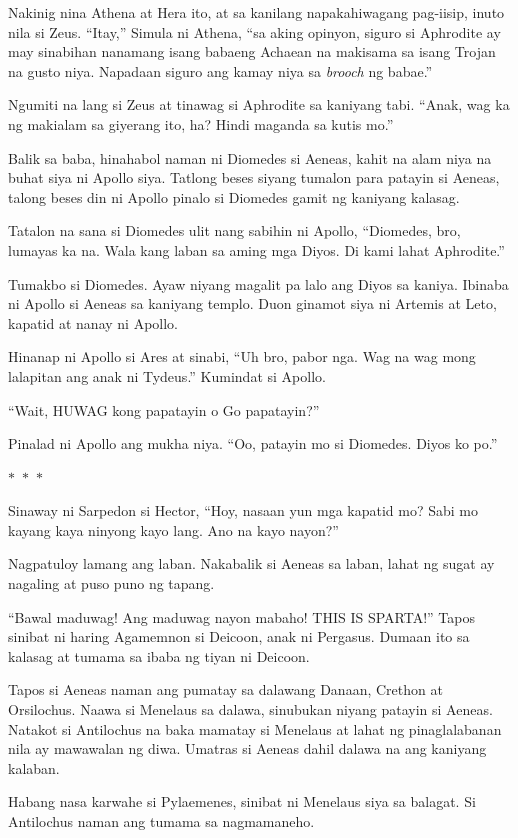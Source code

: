 \documentclass[12pt,letterpaper]{report}
\newcommand{\seperate}{\begin{center}$\ast$~$\ast$~$\ast$\end{center}}
\begin{document}
Nakinig nina Athena at Hera ito, at sa kanilang napakahiwagang pag-iisip, inuto nila si Zeus. ``Itay,'' Simula ni Athena, ``sa aking opinyon, siguro si Aphrodite ay may sinabihan nanamang isang babaeng Achaean na makisama sa isang Trojan na gusto niya. Napadaan siguro ang kamay niya sa \textit{brooch} ng babae.''

Ngumiti na lang si Zeus at tinawag si Aphrodite sa kaniyang tabi. ``Anak, wag ka ng makialam sa giyerang ito, ha? Hindi maganda sa kutis mo.''

Balik sa baba, hinahabol naman ni Diomedes si Aeneas, kahit na alam niya na buhat siya ni Apollo siya. Tatlong beses siyang tumalon para patayin si Aeneas, talong beses din ni Apollo pinalo si Diomedes gamit ng kaniyang kalasag.

Tatalon na sana si Diomedes ulit nang sabihin ni Apollo, ``Diomedes, bro, lumayas ka na. Wala kang laban sa aming mga Diyos. Di kami lahat Aphrodite.''

Tumakbo si Diomedes. Ayaw niyang magalit pa lalo ang Diyos sa kaniya. Ibinaba ni Apollo si Aeneas sa kaniyang templo. Duon ginamot siya ni Artemis at Leto, kapatid at nanay ni Apollo.

Hinanap ni Apollo si Ares at sinabi, ``Uh bro, pabor nga. Wag na wag mong lalapitan ang anak ni Tydeus.'' Kumindat si Apollo.

``Wait, HUWAG kong papatayin o Go papatayin?''

Pinalad ni Apollo ang mukha niya. ``Oo, patayin mo si Diomedes. Diyos ko po.''

\seperate

Sinaway ni Sarpedon si Hector, ``Hoy, nasaan yun mga kapatid mo? Sabi mo kayang kaya ninyong kayo lang. Ano na kayo nayon?''

Nagpatuloy lamang ang laban. Nakabalik si Aeneas sa laban, lahat ng sugat ay nagaling at puso puno ng tapang.

``Bawal maduwag! Ang maduwag nayon mabaho! THIS IS SPARTA!'' Tapos sinibat ni haring Agamemnon si Deicoon, anak ni Pergasus. Dumaan ito sa kalasag at tumama sa ibaba ng tiyan ni Deicoon.

Tapos si Aeneas naman ang pumatay sa dalawang Danaan, Crethon at Orsilochus. Naawa si Menelaus sa dalawa, sinubukan niyang patayin si Aeneas. Natakot si Antilochus na baka mamatay si Menelaus at lahat ng pinaglalabanan nila ay mawawalan ng diwa. Umatras si Aeneas dahil dalawa na ang kaniyang kalaban.

Habang nasa karwahe si Pylaemenes, sinibat ni Menelaus siya sa balagat. Si Antilochus naman ang tumama sa nagmamaneho.
\end{document}
